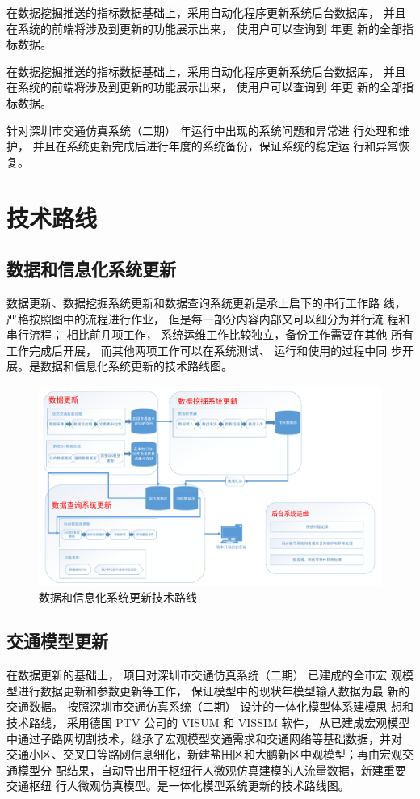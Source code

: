在数据挖掘推送的指标数据基础上，采用自动化程序更新系统后台数据库，
并且在系统的前端将涉及到更新的功能展示出来， 使用户可以查询到 \pyear 年更
新的全部指标数据。

在数据挖掘推送的指标数据基础上，采用自动化程序更新系统后台数据库，
并且在系统的前端将涉及到更新的功能展示出来， 使用户可以查询到 \pyear 年更
新的全部指标数据。

针对深圳市交通仿真系统（二期） \pyear 年运行中出现的系统问题和异常进
行处理和维护， 并且在系统更新完成后进行年度的系统备份，保证系统的稳定运
行和异常恢复。

\section{技术路线}
\subsection{数据和信息化系统更新}
数据更新、数据挖掘系统更新和数据查询系统更新是承上启下的串行工作路
线，严格按照图中的流程进行作业， 但是每一部分内容内部又可以细分为并行流
程和串行流程； 相比前几项工作， 系统运维工作比较独立，备份工作需要在其他
所有工作完成后开展， 而其他两项工作可以在系统测试、 运行和使用的过程中同
步开展。是数据和信息化系统更新的技术路线图。

\begin{figure}[ht]
  \centering
  \includegraphics[width=\textwidth]{figures/chp01_数据和信息化更新技术路线.pdf}
  \caption{数据和信息化系统更新技术路线\label{fig:数据和信息化更新技术路线} }
\end{figure}

\subsection{交通模型更新}
在数据更新的基础上， 项目对深圳市交通仿真系统（二期） 已建成的全市宏
观模型进行数据更新和参数更新等工作， 保证模型中的现状年模型输入数据为最
新的交通数据。 按照深圳市交通仿真系统（二期） 设计的一体化模型体系建模思
想和技术路线， 采用德国 PTV 公司的 VISUM 和 VISSIM 软件， 从已建成宏观模型
中通过子路网切割技术，继承了宏观模型交通需求和交通网络等基础数据，并对
交通小区、交叉口等路网信息细化，新建盐田区和大鹏新区中观模型；再由宏观交通模型分
配结果，自动导出用于枢纽行人微观仿真建模的人流量数据，新建重要交通枢纽
行人微观仿真模型。是一体化模型系统更新的技术路线图。

